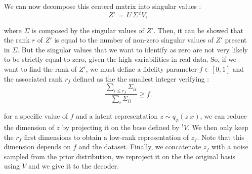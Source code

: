\documentclass{article}
\begin{document}
We can now decompose this centerd matrix into singular values :
\begin{equation}
    Z'\,=\, U\, \Sigma \,^tV,
\end{equation}

where $\Sigma$ is composed by the singular values of $Z'$.
Then, it can be showed that the rank $r$ of $Z'$ is equal to the number of non-zero singular values of $Z'$ present in $\Sigma$. But the singular values that we want to identify as zero are not very likely to be strictly equal to zero, given the high variabilities in real data. So, if we want to find the rank of $Z'$, we must define a fidelity parameter $f \in [0,1]$ and the associated rank $r_f$ defined as the the smallest integer verifying :
\begin{equation}
    \frac{\sum_{i \leq r_f} \Sigma_{ii}}{\sum_i \Sigma_{ii}} \geq f.
\end{equation}

for a specific value of $f$ and a latent representation $z \sim q_\phi (z|x)$, we can reduce the dimension of $z$ by projecting it on the base defined by $^tV$. We then only keep the $r_f$ first dimensions to obtain a low-rank representation of $z_f$. Note that this dimension depends on $f$ and the dataset. Finally, we concatenate $z_f$ with a noise sampled from the prior distribution, we reproject it on the the original basis using $V$ and we give it to the decoder.
\end{document}
